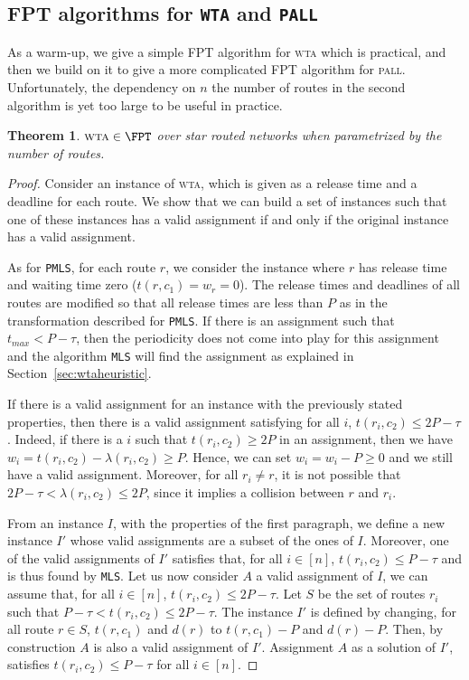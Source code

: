 \documentclass[a4paper,10pt]{journal}
\newcommand\MLS{\texttt{MLS}\xspace}
\newcommand\PMLS{\texttt{PMLS}\xspace}
\newtheorem{theorem}{Theorem}
\newcommand\pall{\textsc{pall}\xspace}
\newcommand\wta{\textsc{wta}\xspace}
\begin{document}
\subsection{FPT algorithms for \texttt{WTA} and \texttt{PALL}}

As a warm-up, we give a simple FPT algorithm for \wta which is practical,
and then we build on it to give a more complicated FPT algorithm for \pall. Unfortunately, the dependency on $n$ the number of routes in the second algorithm is yet too large to be useful in practice. 

\begin{theorem}\label{th:braFPT}
$\wta \in \FPT$ over star routed networks when parametrized by the number of routes.
\end{theorem}
\begin{proof}
 Consider an instance of \wta, which is given as a release time and a deadline for each route.
 We show that we can build a set of instances such that one of these instances has a valid assignment if and only if the original instance has a valid assignment.

  As for \PMLS, for each route $r$, we consider the instance where $r$ has release time and waiting time zero ($t(r,c_1) = w_r = 0$). The release times and deadlines of all routes are modified so that all release times are less than $P$ as in the transformation described for \PMLS. If there is an assignment such that $t_{max} < P-\tau$, then the periodicity does not come into play for this assignment and the algorithm \MLS will find the assignment as explained in Section~\ref{sec:wtaheuristic}.

 If there is a valid assignment for an instance with the previously stated properties,
 then there is a valid assignment satisfying for all $i$, $t(r_i,c_2) \leq 2P - \tau$.  
 Indeed, if there is a $i$ such that $t(r_i,c_2) \geq 2P$ in an assignment, then we have 
 $w_i = t(r_i,c_2) - \lambda(r_i,c_2) \geq P$. Hence, we can set $w_i = w_i -P \geq 0$ and we still have 
 a valid assignment. Moreover, for all $r_i \neq r$, it is not possible that $2P-\tau < \lambda(r_i,c_2) \leq 2P$, since it implies a collision between $r$ and $r_i$.
 

From an instance $I$, with the properties of the first paragraph, we define a new instance $I'$ whose valid assignments are a subset of the ones of $I$. Moreover, one of the valid assignments of $I'$ satisfies that, for all $i \in [n]$, $t(r_i,c_2) \leq P - \tau$ and is thus found by \MLS. 
Let us now consider $A$ a valid assignment of $I$, we can assume that, for all $i \in [n]$, $t(r_i,c_2) \leq 2P - \tau$. Let $S$ be the set of routes $r_i$ such that  $P - \tau < t(r_i,c_2) \leq 2P - \tau$. The instance $I'$ is defined by changing, for all route $r \in S$, $t(r,c_1)$ and $d(r)$ to $t(r,c_1) - P$ and $d(r) - P$. Then, by construction $A$ is also a valid assignment of $I'$. Assignment $A$ as a solution of $I'$, satisfies $t(r_i,c_2) \leq P - \tau$ for all $i\in [n]$. 


\end{proof}
\end{document}
